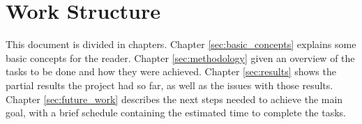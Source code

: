 \section*{Work Structure}

This document is divided in chapters. Chapter \ref{sec:basic_concepts} explains some basic concepts for the reader. Chapter \ref{sec:methodology} given an overview of the tasks to be done and how they were achieved. Chapter \ref{sec:results} shows the partial results the project had so far, as well as the issues with those results. Chapter \ref{sec:future_work} describes the next steps needed to achieve the main goal, with a brief schedule containing the estimated time to complete the tasks.